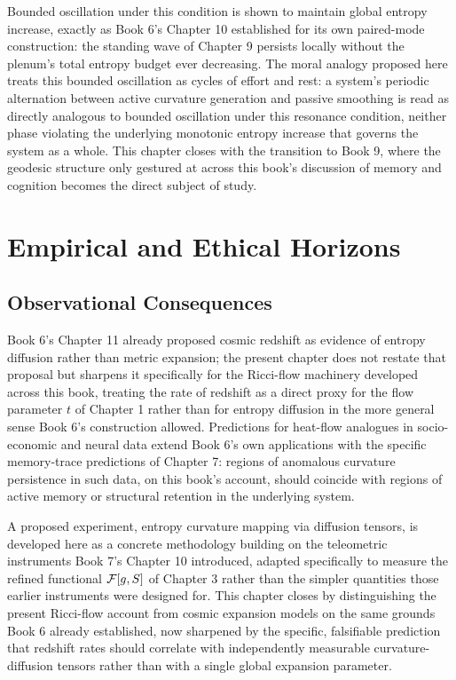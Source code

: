 Bounded oscillation under this condition is shown to maintain global entropy increase, exactly as Book 6's Chapter 10 established for its own paired-mode construction: the standing wave of Chapter 9 persists locally without the plenum's total entropy budget ever decreasing. The moral analogy proposed here treats this bounded oscillation as cycles of effort and rest: a system's periodic alternation between active curvature generation and passive smoothing is read as directly analogous to bounded oscillation under this resonance condition, neither phase violating the underlying monotonic entropy increase that governs the system as a whole. This chapter closes with the transition to Book 9, where the geodesic structure only gestured at across this book's discussion of memory and cognition becomes the direct subject of study.

\part{Empirical and Ethical Horizons}

\chapter{Observational Consequences}

Book 6's Chapter 11 already proposed cosmic redshift as evidence of entropy diffusion rather than metric expansion; the present chapter does not restate that proposal but sharpens it specifically for the Ricci-flow machinery developed across this book, treating the rate of redshift as a direct proxy for the flow parameter $t$ of Chapter 1 rather than for entropy diffusion in the more general sense Book 6's construction allowed. Predictions for heat-flow analogues in socio-economic and neural data extend Book 6's own applications with the specific memory-trace predictions of Chapter 7: regions of anomalous curvature persistence in such data, on this book's account, should coincide with regions of active memory or structural retention in the underlying system.

A proposed experiment, entropy curvature mapping via diffusion tensors, is developed here as a concrete methodology building on the teleometric instruments Book 7's Chapter 10 introduced, adapted specifically to measure the refined functional $\mathcal{F}[g, S]$ of Chapter 3 rather than the simpler quantities those earlier instruments were designed for. This chapter closes by distinguishing the present Ricci-flow account from cosmic expansion models on the same grounds Book 6 already established, now sharpened by the specific, falsifiable prediction that redshift rates should correlate with independently measurable curvature-diffusion tensors rather than with a single global expansion parameter.

